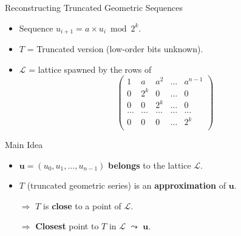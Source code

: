\begin{frame}{Reconstructing Truncated Geometric Sequences}

\begin{itemize}
    \item Sequence $u_{i+1} = a \times u_i \bmod 2^k$.
    \item $T$ = Truncated version (low-order bits unknown).

\item \(\mathcal{L}\) = lattice spawned by the rows of
\[
 \begin{pmatrix}
    1 & a   & a^2 & \dots & a^{n-1} \\
    0 & 2^{k} & 0   & \dots & 0 \\
    0 & 0   & 2^{k} & \dots & 0 \\
    \dots & \dots & \dots & \dots & \dots\\
    0 & 0 & 0 & \dots & 2^{k} \\
  \end{pmatrix}
\]        
\end{itemize}

\medskip

\begin{block}{Main Idea}
\begin{itemize}
\item $\mathbf{u} = (u_0, u_1, \dots, u_{n-1})$ \textbf{belongs} to the lattice $\mathcal{L}$.
\item $T$ (truncated geometric series) is an \textbf{approximation} of $\mathbf{u}$.
\item[$\Rightarrow$] $T$ is \textbf{close} to a point of $\mathcal{L}$.
\item[$\Rightarrow$] \textbf{Closest} point to $T$ in $\mathcal{L}$ $\leadsto$ $\mathbf{u}$.
\end{itemize}
\end{block}
\end{frame}



